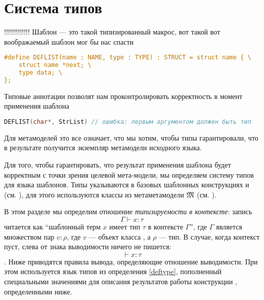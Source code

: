 \section{Система типов}

!!!!!!!!!!!!! Шаблон --- это такой типизированный макрос, вот такой вот воображаемый шаблон мог бы нас спасти
\begin{lstlisting}[language=C]
#define DEFLIST(name : NAME, type : TYPE) : STRUCT = struct name { \
	struct name *next; \
	type data; \
};
\end{lstlisting}
Типовые аннотации позволят нам проконтролировать корректность в момент применения шаблона
\begin{lstlisting}[language=C]
DEFLIST(char*, StrList) // ошибка: первым аргументом должен быть тип
\end{lstlisting}
Для метамоделей это все означает, что мы хотим, чтобы типы гарантировали, что в результате получится экземпляр метамодели исходного языка.

Для того, чтобы гарантировать, что результат применения шаблона будет корректным с точки зрения целевой мета-модели, мы определяем систему типов для языка шаблонов. Типы указываются в базовых шаблонных конструкциях   и  (см. ), для этого используются классы из метаметамодели $\mathfrak{M}$ (см. ). 

В этом разделе мы определим отношение \emph{типизируемости в контексте}: запись 
$$\Gamma \vdash x : \tau$$
читается как ``шаблонный терм $x$ имеет тип $\tau$ в контексте $\Gamma$'', где $\Gamma$ является множеством пар $v : \rho$, где $v$ --- объект класса , а $\rho$ --- тип. В случае, когда контекст пуст, слева от знака выводимости ничего не пишется: 
$$\vdash x : \tau$$. Ниже приводятся правила вывода, определяющие отношение выводимости. При этом используется язык типов из определения \ref{deftype}, пополненный специальными значениями для описания результатов работы конструкции , определенными ниже. 

